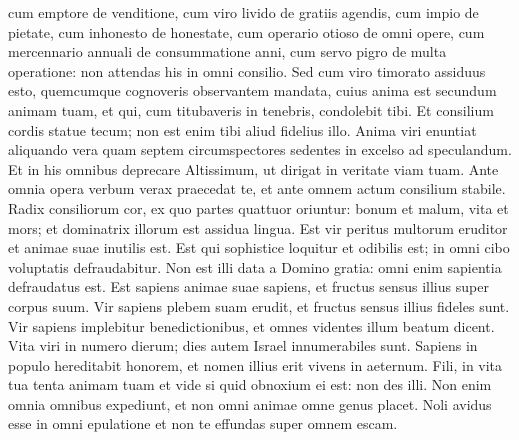 \begin{biblechapter}
\begin{biblechapter}
\begin{biblechapter}
\begin{biblechapter}
\begin{biblechapter}
\begin{biblechapter}
\begin{biblechapter}
\begin{biblechapter}
\begin{biblechapter}
\begin{biblechapter}
\begin{biblechapter}
\begin{biblechapter}
\begin{biblechapter}
\begin{biblechapter}
\begin{biblechapter}
\begin{biblechapter}
\begin{biblechapter}
\begin{biblechapter}
\begin{biblechapter}
\begin{biblechapter}
\begin{biblechapter}
\begin{biblechapter}
\begin{biblechapter}
\begin{biblechapter}
\begin{biblechapter}
\begin{biblechapter}
\begin{biblechapter}
\begin{biblechapter}
\begin{biblechapter}
\begin{biblechapter}
\begin{biblechapter}
\begin{biblechapter}
\begin{biblechapter}
\begin{biblechapter}
\begin{biblechapter}
\begin{biblechapter}
\begin{biblechapter}
 cum emptore de venditione,
 cum viro livido de gratiis agendis,
 \verse cum impio de pietate,
 cum inhonesto de honestate,
 cum operario otioso de omni opere,
 \verse cum mercennario annuali de consummatione anni,
 cum servo pigro de multa operatione:
 non attendas his in omni consilio.
 \verse Sed cum viro timorato assiduus esto,
 quemcumque cognoveris observantem mandata,
 \verse cuius anima est secundum animam tuam,
 et qui, cum titubaveris in tenebris, condolebit tibi.
 \verse Et consilium cordis statue tecum;
 non est enim tibi aliud fidelius illo.
 \verse Anima viri enuntiat aliquando vera
 quam septem circumspectores sedentes in excelso ad speculandum.
 \verse Et in his omnibus deprecare Altissimum,
 ut dirigat in veritate viam tuam.
 \verse Ante omnia opera verbum verax praecedat te,
 et ante omnem actum consilium stabile.
 \verse Radix consiliorum cor,
 ex quo partes quattuor oriuntur:
 bonum et malum, vita et mors;
 et dominatrix illorum est assidua lingua.
 \verse Est vir peritus multorum eruditor
 et animae suae inutilis est.
 \verse Est qui sophistice loquitur et odibilis est;
 in omni cibo voluptatis defraudabitur.
 \verse Non est illi data a Domino gratia:
 omni enim sapientia defraudatus est.
 \verse Est sapiens animae suae sapiens,
 et fructus sensus illius super corpus suum.
 \verse Vir sapiens plebem suam erudit,
 et fructus sensus illius fideles sunt.
 \verse Vir sapiens implebitur benedictionibus,
 et omnes videntes illum beatum dicent.
 \verse Vita viri in numero dierum;
 dies autem Israel innumerabiles sunt.
 \verse Sapiens in populo hereditabit honorem,
 et nomen illius erit vivens in aeternum.
 \verse Fili, in vita tua tenta animam tuam
 et vide si quid obnoxium ei est: non des illi.
 \verse Non enim omnia omnibus expediunt,
 et non omni animae omne genus placet.
 \verse Noli avidus esse in omni epulatione
 et non te effundas super omnem escam.

\end{biblechapter}
\end{biblechapter}
\end{biblechapter}
\end{biblechapter}
\end{biblechapter}
\end{biblechapter}
\end{biblechapter}
\end{biblechapter}
\end{biblechapter}
\end{biblechapter}
\end{biblechapter}
\end{biblechapter}
\end{biblechapter}
\end{biblechapter}
\end{biblechapter}
\end{biblechapter}
\end{biblechapter}
\end{biblechapter}
\end{biblechapter}
\end{biblechapter}
\end{biblechapter}
\end{biblechapter}
\end{biblechapter}
\end{biblechapter}
\end{biblechapter}
\end{biblechapter}
\end{biblechapter}
\end{biblechapter}
\end{biblechapter}
\end{biblechapter}
\end{biblechapter}
\end{biblechapter}
\end{biblechapter}
\end{biblechapter}
\end{biblechapter}
\end{biblechapter}
\end{biblechapter}
